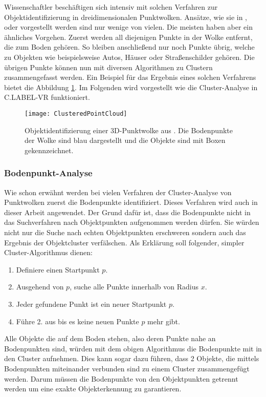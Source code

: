 Wissenschaftler beschäftigen sich intensiv mit solchen Verfahren zur Objektidentifizierung in dreidimensionalen Punktwolken. Ansätze, wie sie in \cite{bib:Segmentation1}, \cite{bib:Segmentation2} oder \cite{bib:Segmentation3} vorgestellt werden sind nur wenige von vielen. Die meisten haben aber ein ähnliches Vorgehen. Zuerst werden all diejenigen Punkte in der Wolke entfernt, die zum Boden gehören. So bleiben anschließend nur noch Punkte übrig, welche zu Objekten wie beispielsweise Autos, Häuser oder Straßenschilder gehören. Die übrigen Punkte können nun mit diversen Algorithmen zu Clustern zusammengefasst werden. Ein Beispiel für das Ergebnis eines solchen Verfahrens bietet die Abbildung \ref{fig:ClusteredCloud}. Im Folgenden wird vorgestellt wie die Cluster-Analyse in C.LABEL-VR funktioniert.

\begin{figure}%
	\centering
    \texttt{[image: ClusteredPointCloud]}
    \caption{Objektidentifizierung einer 3D-Punktwolke aus \cite{bib:Segmentation1}. Die Bodenpunkte der Wolke sind blau dargestellt und die Objekte sind mit Boxen gekennzeichnet.}
    \label{fig:ClusteredCloud}
\end{figure}

\subsubsection{Bodenpunkt-Analyse}
\label{sec:GroundPointSegmentation}
Wie schon erwähnt werden bei vielen Verfahren der Cluster-Analyse von Punktwolken zuerst die Bodenpunkte identifiziert. Dieses Verfahren wird auch in dieser Arbeit angewendet. Der Grund dafür ist, dass die Bodenpunkte nicht in das Suchverfahren nach Objektpunkten aufgenommen werden dürfen. Sie würden nicht nur die Suche nach echten Objektpunkten erschweren sondern auch das Ergebnis der Objektcluster verfälschen. Als Erklärung soll folgender, simpler Cluster-Algorithmus dienen:

\begin{enumerate}
\item Definiere einen Startpunkt $p$.
\item Ausgehend von $p$, suche alle Punkte innerhalb von Radius \(x\). 
\item Jeder gefundene Punkt ist ein neuer Startpunkt $p$.
\item Führe 2. aus bis es keine neuen Punkte $p$ mehr gibt.
\end{enumerate} 

Alle Objekte die auf dem Boden stehen, also deren Punkte nahe an Bodenpunkten sind, würden mit dem obigen Algorithmus die Bodenpunkte mit in den Cluster aufnehmen. Dies kann sogar dazu führen, dass 2 Objekte, die mittels Bodenpunkten miteinander verbunden sind zu einem Cluster zusammengefügt werden. Darum müssen die Bodenpunkte von den Objektpunkten getrennt werden um eine exakte Objekterkennung zu garantieren.

